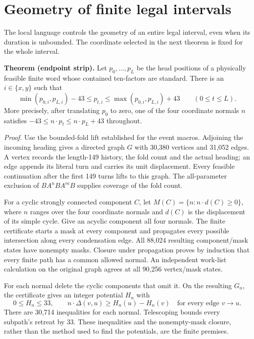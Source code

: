 \section{Geometry of finite legal intervals}\label{sec:silent-geometry}
The local language controls the geometry of an entire legal interval, even
when its duration is unbounded. The coordinate selected in the next theorem
is fixed for the whole interval.

\textbf{Theorem (endpoint strip).}
Let $p_0,\ldots,p_L$ be the head positions of a physically feasible finite
word whose contained ten-factors are standard. There is an $i\in\{x,y\}$ such that
\[
 \min(p_{0,i},p_{L,i})-43\le p_{t,i}\le
 \max(p_{0,i},p_{L,i})+43\qquad(0\le t\le L).
\]
More precisely, after translating $p_0$ to zero, one of the four coordinate
normals $n$ satisfies $-43\le n\cdot p_t\le n\cdot p_L+43$ throughout.

\textit{Proof.}
Use the bounded-fold lift established for the event macros. Adjoining the
incoming heading gives a directed graph $G$ with 30,380 vertices and 31,052
edges. A vertex records the length-149 history, the fold count and the actual
heading; an edge appends its literal turn and carries its unit displacement.
Every feasible continuation after the first 149 turns lifts to this graph.
The all-parameter exclusion of $BA^nBA^mB$ supplies coverage of the fold count.

For a cyclic strongly connected component $C$, let
$M(C)=\{n:n\cdot d(C)\ge0\}$, where $n$ ranges over the four coordinate
normals and $d(C)$ is the displacement of its simple cycle. Give an acyclic
component all four normals. The finite certificate starts a mask at every
component and propagates every possible intersection along every condensation
edge. All 88,024 resulting component/mask states have nonempty masks.
Closure under propagation proves by induction that every finite path has a
common allowed normal. An independent work-list calculation on the original
graph agrees at all 90,256 vertex/mask states.

For each normal delete the cyclic components that omit it. On the resulting
$G_n$, the certificate gives an integer potential $H_n$ with
\[
 0\le H_n\le33,\qquad
 n\cdot\Delta(v,u)\ge H_n(u)-H_n(v)
 \quad\text{for every edge }v\longrightarrow u.
\]
There are 30,714 inequalities for each normal. Telescoping bounds every
subpath's retreat by 33. These inequalities and the nonempty-mask closure,
rather than the method used to find the potentials, are the finite premises.

